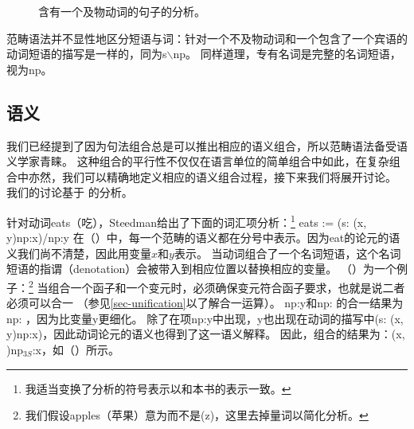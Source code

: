 \begin{figure}
\centerline{%
}
\caption{\label{abb-the-cat-chased-Mary}含有一个及物动词的句子的分析。}
\end{figure}%

\noindent
范畴语法并不显性地区分短语与词：针对一个不及物动词和一个包含了一个宾语的动词短语的描写是一样的，同为s$\backslash$np。
同样道理，专有名词是完整的名词短语，视为np。
\isc{$\backslash$}
\is{$\backslash$|)}

\subsection{语义}

我们已经提到了因为句法组合总是可以推出相应的语义组合，所以范畴语法备受语义学家青睐。
这种组合的平行性不仅仅在语言单位的简单组合中如此，在复杂组合中亦然，我们可以精确地定义相应的语义组合过程，接下来我们将展开讨论。
我们的讨论基于 \citet[\S~2.1.2]{Steedman97a}的分析。

针对动词eats（吃），Steedman给出了下面的词汇项分析：\footnote{%
 我适当变换了分析的符号表示以和本书的表示一致。
}
\ea
eats := (s: (x, y)\bs np:x)/np:y
\z
在（）中，每一个范畴的语义都在分号中表示。因为eat的论元的语义我们尚不清楚，因此用变量$x$和$y$表示。
当动词组合了一个名词短语，这个名词短语的指谓（denotation）会被带入到相应位置以替换相应的变量。
（）为一个例子：\footnote{%
  我们假设apples（苹果）意为而不是(z)，这里去掉量词以简化分析。
}
\ea
{}
\z
当组合一个函子和一个变元时，必须确保变元符合函子要求，也就是说二者必须可以合一
（参见\ref{sec-unification}以了解合一运算）。
np:y和np: 的合一结果为np: ，因为比变量y更细化。
除了在项np:y中出现，y也出现在动词的描写中(s: (x, y)\bs np:x)，因此动词论元的语义也得到了这一语义解释。
因此，组合的结果为：(x, )\bs np$_{3S}$:x，如（）所示。


